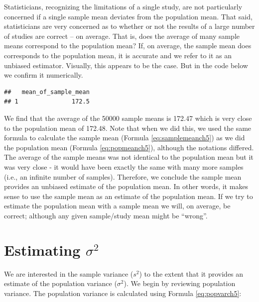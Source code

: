 \documentclass[
]{krantz}
\makeatletter
\newenvironment{Shaded}{\begin{snugshade}}{\end{snugshade}}
\newcommand{\DataTypeTok}[1]{\textcolor[rgb]{0.27,0.27,0.27}{#1}}
\newcommand{\KeywordTok}[1]{\textcolor[rgb]{0.27,0.27,0.27}{\textbf{#1}}}
\newcommand{\NormalTok}[1]{#1}
\newcommand{\OperatorTok}[1]{\textcolor[rgb]{0.43,0.43,0.43}{\textbf{#1}}}
\newcommand{\StringTok}[1]{\textcolor[rgb]{0.5,0.5,0.5}{#1}}
\newenvironment{kframe}{%
\medskip{}
\setlength{\fboxsep}{.8em}
 \def\at@end@of@kframe{}%
 \ifinner\ifhmode%
  \def\at@end@of@kframe{\end{minipage}}%
  \begin{minipage}{\columnwidth}%
 \fi\fi%
 \def\FrameCommand##1{\hskip\@totalleftmargin \hskip-\fboxsep
 \colorbox{shadecolor}{##1}\hskip-\fboxsep
     \hskip-\linewidth \hskip-\@totalleftmargin \hskip\columnwidth}%
 \MakeFramed {\advance\hsize-\width
   \@totalleftmargin\z@ \linewidth\hsize
   \@setminipage}}%
 {\par\unskip\endMakeFramed%
 \at@end@of@kframe}
\renewenvironment{Shaded}{\begin{kframe}}{\end{kframe}}
\makeatother
\begin{document}
Statisticians, recognizing the limitations of a single study, are not particularly concerned if a single sample mean deviates from the population mean. That said, statisticians are very concerned as to whether or not the results of a large number of studies are correct -- on average. That is, does the average of many sample means correspond to the population mean? If, on average, the sample mean does corresponds to the population mean, it is accurate and we refer to it as an unbiased estimator. Visually, this appears to be the case. But in the code below we confirm it numerically.

\begin{Shaded}
\end{Shaded}

\begin{verbatim}
##   mean_of_sample_mean
## 1               172.5
\end{verbatim}

We find that the average of the 50000 sample means is 172.47 which is very close to the population mean of 172.48. Note that when we did this, we used the same formula to calculate the sample mean (Formula \eqref{eq:samplemeanch5}) as we did the population mean (Formula \eqref{eq:popmeanch5}), although the notations differed. The average of the sample means was not identical to the population mean but it was very close - it would have been exactly the same with many more samples (i.e., an infinite number of samples). Therefore, we conclude the sample mean provides an unbiased estimate of the population mean. In other words, it makes sense to use the sample mean as an estimate of the population mean. If we try to estimate the population mean with a sample mean we will, on average, be correct; although any given sample/study mean might be ``wrong''.

\hypertarget{estimating-sigma2}{%
\section{\texorpdfstring{Estimating \(\sigma^2\)}{Estimating \textbackslash sigma\^{}2}}\label{estimating-sigma2}}

We are interested in the sample variance (\(s^2\)) to the extent that it provides an estimate of the population variance (\(\sigma^2\)). We begin by reviewing population variance. The population variance is calculated using Formula \eqref{eq:popvarch5}:
\end{document}
